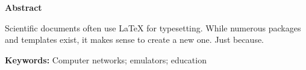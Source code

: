 
\cleardoublepage\thispagestyle{plain}

\textbf{\Large Abstract}

Scientific documents often use \LaTeX{} for typesetting. While numerous
packages and templates exist, it makes sense to create a new one. Just
because.

\textbf{Keywords:} Computer networks; emulators; education
